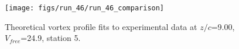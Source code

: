 \begin{figure}[H]
\centering
\texttt{[image: figs/run\_46/run\_46\_comparison]}
\caption{Theoretical vortex profile fits to experimental data at $z/c$=9.00, $V_{free}$=24.9, station 5.}
\end{figure}


